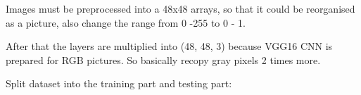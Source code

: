 Images must be preprocessed into a 48x48 arrays, so that it could be reorganised as a picture, also change the range from 0 -255 to 0 - 1.

After that the layers are multiplied into (48, 48, 3) because VGG16 CNN is prepared for RGB pictures. So basically recopy gray pixels 2 times more.

Split dataset into the training part and testing part:

~\cite{repo}